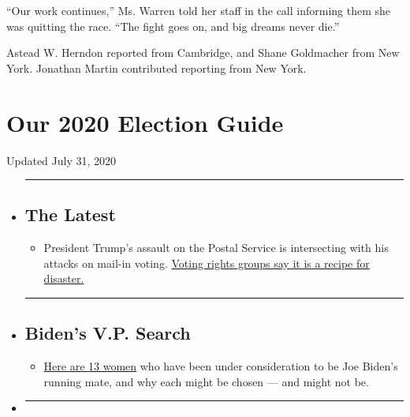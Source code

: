 ``Our work continues,'' Ms. Warren told her staff in the call informing
them she was quitting the race. ``The fight goes on, and big dreams
never die.''

Astead W. Herndon reported from Cambridge, and Shane Goldmacher from New
York. Jonathan Martin contributed reporting from New York.

\hypertarget{our-2020-election-guide}{%
\section{Our 2020 Election Guide}\label{our-2020-election-guide}}

Updated July 31, 2020

\begin{itemize}
\item
  \begin{center}\rule{0.5\linewidth}{\linethickness}\end{center}

  \hypertarget{the-latest}{%
  \subsection{The Latest}\label{the-latest}}

  \begin{itemize}
  \tightlist
  \item
    President Trump's assault on the Postal Service is intersecting with
    his attacks on mail-in voting.
    \href{https://www.nytimes.com/2020/07/31/us/politics/trump-usps-mail-delays.html?action=click\&pgtype=Article\&state=default\&region=BELOW_MAIN_CONTENT\&context=storylines_guide}{Voting
    rights groups say it is a recipe for disaster.}
  \end{itemize}
\item
  \begin{center}\rule{0.5\linewidth}{\linethickness}\end{center}

  \hypertarget{bidens-vp-search}{%
  \subsection{Biden's V.P. Search}\label{bidens-vp-search}}

  \begin{itemize}
  \tightlist
  \item
    \href{https://www.nytimes.com/article/biden-vice-president-2020.html?action=click\&pgtype=Article\&state=default\&region=BELOW_MAIN_CONTENT\&context=storylines_guide}{Here
    are 13 women} who have been under consideration to be Joe Biden's
    running mate, and why each might be chosen --- and might not be.
  \end{itemize}
\item
  \begin{center}\rule{0.5\linewidth}{\linethickness}\end{center}


\end{itemize}
